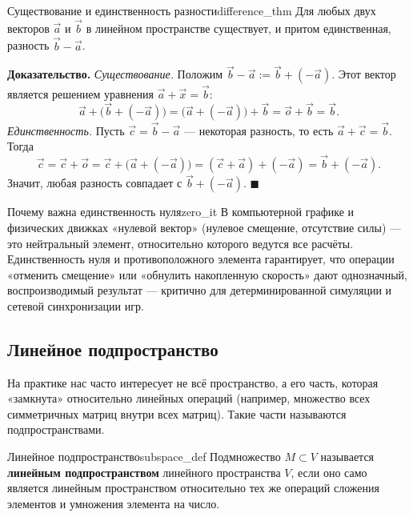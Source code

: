 \documentclass[12pt,a4paper]{article}
\newenvironment{myproof}{\noindent\textbf{Доказательство.}}{\hfill$\blacksquare$}
\begin{document}
\begin{theorem}{Существование и единственность разности}{difference_thm}
Для любых двух векторов $\vec{a}$ и $\vec{b}$ в линейном пространстве
существует, и притом единственная, разность $\vec{b} - \vec{a}$.
\end{theorem}

\begin{myproof}
\textit{Существование.} Положим $\vec{b} - \vec{a} := \vec{b} + (-\vec{a})$.
Этот вектор является решением уравнения $\vec{a} + \vec{x} = \vec{b}$:
\[
\vec{a} + \big(\vec{b} + (-\vec{a})\big)
= \big(\vec{a} + (-\vec{a})\big) + \vec{b}
= \vec{o} + \vec{b} = \vec{b}.
\]
\textit{Единственность.} Пусть $\vec{c} = \vec{b} - \vec{a}$ — некоторая
разность, то есть $\vec{a} + \vec{c} = \vec{b}$. Тогда
\[
\vec{c} = \vec{c} + \vec{o} = \vec{c} + \big(\vec{a} + (-\vec{a})\big)
= (\vec{c} + \vec{a}) + (-\vec{a}) = \vec{b} + (-\vec{a}).
\]
Значит, любая разность совпадает с $\vec{b} + (-\vec{a})$.
\end{myproof}

\begin{remarkIT}{Почему важна единственность нуля}{zero_it}
В компьютерной графике и физических движках «нулевой вектор» (нулевое
смещение, отсутствие силы) — это нейтральный элемент, относительно
которого ведутся все расчёты. Единственность нуля и противоположного
элемента гарантирует, что операции «отменить смещение» или
«обнулить накопленную скорость» дают однозначный, воспроизводимый
результат — критично для детерминированной симуляции и сетевой
синхронизации игр.
\end{remarkIT}

\subsection{Линейное подпространство}

На практике нас часто интересует не всё пространство, а его часть,
которая «замкнута» относительно линейных операций (например, множество
всех симметричных матриц внутри всех матриц). Такие части называются
подпространствами.

\begin{definition}{Линейное подпространство}{subspace_def}
Подмножество $M \subset V$ называется \textbf{линейным
подпространством} линейного пространства $V$, если оно само является
линейным пространством относительно тех же операций сложения
элементов и умножения элемента на число.
\end{definition}
\end{document}
